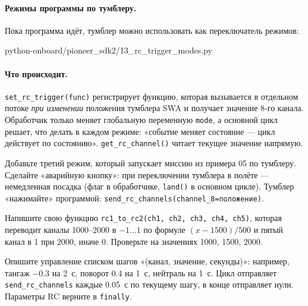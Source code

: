 \paragraph{Режимы программы по тумблеру.} Пока программа идёт, тумблер можно использовать как переключатель режимов:

\begin{codefile}[python]{python-onboard/pioneer_sdk2/13_rc_trigger_modes.py}
\end{codefile}

\paragraph{Что происходит.} \verb|set_rc_trigger(func)| регистрирует функцию, которая вызывается в отдельном потоке \emph{при изменении} положения тумблера SWA и получает значение 8-го канала. Обработчик только меняет глобальную переменную \verb|mode|, а основной цикл решает, что делать в каждом режиме: «событие меняет состояние --- цикл действует по состоянию». \verb|get_rc_channel()| читает текущее значение напрямую.

\begin{taskbox}
Добавьте третий режим, который запускает миссию из примера 05 по тумблеру. Сделайте «аварийную кнопку»: при переключении тумблера в полёте --- немедленная посадка (флаг в обработчике, \verb|land()| в основном цикле). Тумблер «нажимайте» программой: \verb|send_rc_channels(channel_8=положение)|.
\end{taskbox}

\begin{taskbox}
Напишите свою функцию \verb|rc1_to_rc2(ch1, ch2, ch3, ch4, ch5)|, которая переводит каналы 1000--2000 в $-1\ldots1$ по формуле $(x-1500)/500$ и пятый канал в 1 при 2000, иначе 0. Проверьте на значениях 1000, 1500, 2000.
\end{taskbox}

\begin{taskbox}
Опишите управление списком шагов «(канал, значение, секунды)»: например, тангаж $-0.3$ на 2~с, поворот $0.4$ на 1~с, нейтраль на 1~с. Цикл отправляет \verb|send_rc_channels| каждые 0.05~с по текущему шагу, в конце отправляет нули. Параметры RC верните в \verb|finally|.
\end{taskbox}
